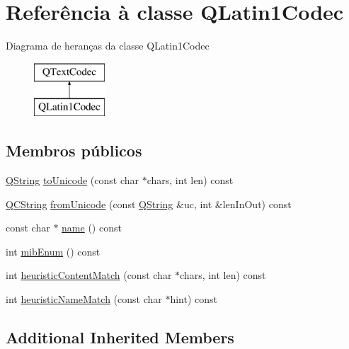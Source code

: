 \hypertarget{class_q_latin1_codec}{\section{Referência à classe Q\-Latin1\-Codec}
\label{class_q_latin1_codec}
}
Diagrama de heranças da classe Q\-Latin1\-Codec\begin{figure}[H]
\begin{center}
\leavevmode
\includegraphics[height=2.000000cm]{class_q_latin1_codec}
\end{center}
\end{figure}
\subsection*{Membros públicos}
\begin{DoxyCompactItemize}
\item 
\hyperlink{class_q_string}{Q\-String} \hyperlink{class_q_latin1_codec_a007974789d47a38acb95816cd5486c8c}{to\-Unicode} (const char $\ast$chars, int len) const 
\item 
\hyperlink{class_q_c_string}{Q\-C\-String} \hyperlink{class_q_latin1_codec_a2c6f9097505dec2780031e680be1c835}{from\-Unicode} (const \hyperlink{class_q_string}{Q\-String} \&uc, int \&len\-In\-Out) const 
\item 
const char $\ast$ \hyperlink{class_q_latin1_codec_a25844783e4bef74ca9a17519c239a27e}{name} () const 
\item 
int \hyperlink{class_q_latin1_codec_a5272a4ca2c3d9cdba1c3f2fac3e4d6bd}{mib\-Enum} () const 
\item 
int \hyperlink{class_q_latin1_codec_ab3ad57260f7cb722cb3b237369d23044}{heuristic\-Content\-Match} (const char $\ast$chars, int len) const 
\item 
int \hyperlink{class_q_latin1_codec_a7fb3e310dd10564c6a7e2b707a336bbf}{heuristic\-Name\-Match} (const char $\ast$hint) const 
\end{DoxyCompactItemize}
\subsection*{Additional Inherited Members}


